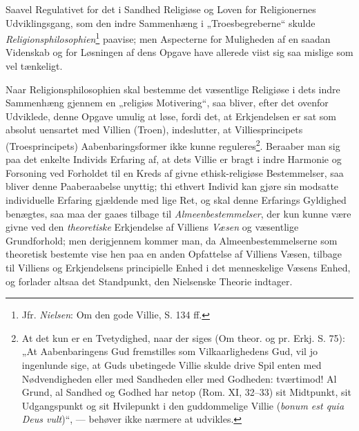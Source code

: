 \documentclass[12pt,a4paper]{book}
\newcommand{\opage}[1]{\marginnote{\footnotesize\textit{[#1]}}}
\begin{document}
Saavel Regulativet for det i Sandhed Religiøse og Loven for Religionernes Udviklingsgang, som den
indre Sammenhæng i „Troesbegreberne“ skulde \emph{Religionsphilosophien}\footnote{Jfr. \emph{Nielsen}: Om den gode Villie, S. 134 ff.} paavise; men Aspecterne for Muligheden af en saadan Videnskab og
for Løsningen af dens Opgave have allerede viist sig saa mislige som vel tænkeligt.

Naar Religionsphilosophien skal bestemme det væsentlige Religiøse i dets indre Sammenhæng gjennem
en „religiøs Motivering“, saa bliver, efter det ovenfor Udviklede, denne Opgave umulig at løse,
fordi det, at Erkjen\opage{203}delsen er sat som absolut uensartet med Villien (Troen), indeslutter, at
Villiesprincipets (Troesprincipets) Aabenbaringsformer ikke kunne reguleres\footnote{At det kun
er en Tvetydighed, naar der siges (Om theor. og pr. Erkj. S. 75): „At Aabenbaringens Gud
fremstilles som Vilkaarlighedens Gud, vil jo ingenlunde sige, at Guds ubetingede Villie skulde
drive Spil enten med Nødvendigheden eller med Sandheden eller med Godheden: tværtimod! Al Grund,
al Sandhed og Godhed har netop (Rom. XI, 32--33) sit Midtpunkt, sit Udgangspunkt og sit
Hvilepunkt i den guddommelige Villie (\textit{bonum est quia Deus vult})“, --- behøver ikke nærmere at
udvikles.}. Beraaber man sig paa det enkelte Individs Erfaring af, at dets Villie er bragt i
indre Harmonie og Forsoning ved Forholdet til en Kreds af givne ethisk-religiøse Bestemmelser,
saa bliver denne Paaberaabelse unyttig; thi ethvert Individ kan gjøre sin modsatte individuelle
Erfaring gjældende med lige Ret, og skal denne Erfarings Gyldighed benægtes, saa maa der gaaes
tilbage til \emph{Almeenbestemmelser}, der kun kunne være givne ved den \emph{theoretiske} Erkjendelse af Villiens \emph{Væsen} og væsentlige Grundforhold; men derigjennem kommer man, da
Almeenbestemmelserne som theoretisk bestemte vise hen paa en anden Opfattelse af Villiens Væsen,
tilbage til Villiens og Erkjendelsens principielle Enhed i det menneskelige Væsens Enhed, og
forlader altsaa det Standpunkt, den Nielsenske Theorie indtager.
\end{document}
